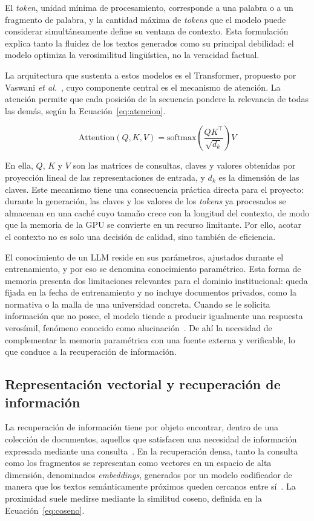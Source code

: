 El \textit{token}, unidad mínima de procesamiento, corresponde a una palabra o a un fragmento de palabra, y la cantidad máxima de \textit{tokens} que el modelo puede considerar simultáneamente define su ventana de contexto. Esta formulación explica tanto la fluidez de los textos generados como su principal debilidad: el modelo optimiza la verosimilitud lingüística, no la veracidad factual.

La arquitectura que sustenta a estos modelos es el Transformer, propuesto por Vaswani \textit{et al.}~\cite{vaswani2017attention}, cuyo componente central es el mecanismo de atención. La atención permite que cada posición de la secuencia pondere la relevancia de todas las demás, según la Ecuación~\ref{eq:atencion}.

\begin{equation}
\label{eq:atencion}
\mathrm{Attention}(Q, K, V) = \mathrm{softmax}\!\left(\frac{Q K^{\top}}{\sqrt{d_k}}\right) V
\end{equation}

En ella, $Q$, $K$ y $V$ son las matrices de consultas, claves y valores obtenidas por proyección lineal de las representaciones de entrada, y $d_k$ es la dimensión de las claves. Este mecanismo tiene una consecuencia práctica directa para el proyecto: durante la generación, las claves y los valores de los \textit{tokens} ya procesados se almacenan en una caché cuyo tamaño crece con la longitud del contexto, de modo que la memoria de la GPU se convierte en un recurso limitante. Por ello, acotar el contexto no es solo una decisión de calidad, sino también de eficiencia.

El conocimiento de un LLM reside en sus parámetros, ajustados durante el entrenamiento, y por eso se denomina conocimiento paramétrico. Esta forma de memoria presenta dos limitaciones relevantes para el dominio institucional: queda fijada en la fecha de entrenamiento y no incluye documentos privados, como la normativa o la malla de una universidad concreta. Cuando se le solicita información que no posee, el modelo tiende a producir igualmente una respuesta verosímil, fenómeno conocido como alucinación~\cite{ji2023hallucination}. De ahí la necesidad de complementar la memoria paramétrica con una fuente externa y verificable, lo que conduce a la recuperación de información.

\subsection{Representación vectorial y recuperación de información}
La recuperación de información tiene por objeto encontrar, dentro de una colección de documentos, aquellos que satisfacen una necesidad de información expresada mediante una consulta~\cite{manning2008ir}. En la recuperación densa, tanto la consulta como los fragmentos se representan como vectores en un espacio de alta dimensión, denominados \textit{embeddings}, generados por un modelo codificador de manera que los textos semánticamente próximos queden cercanos entre sí~\cite{reimers2019sbert,karpukhin2020dpr}. La proximidad suele medirse mediante la similitud coseno, definida en la Ecuación~\ref{eq:coseno}.

